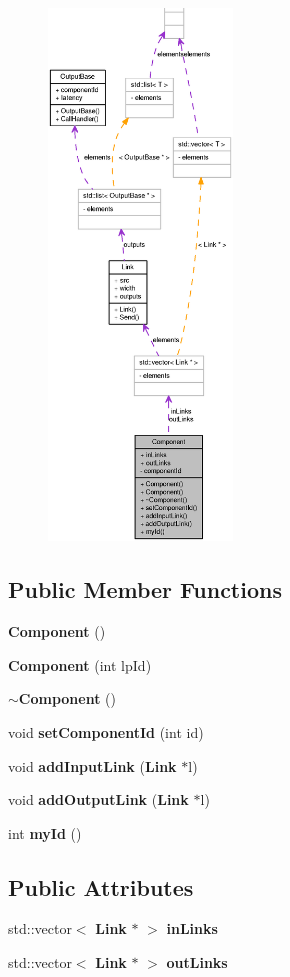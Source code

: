 \begin{figure}[H]
\begin{center}
\leavevmode
\includegraphics[height=400pt]{classComponent__coll__graph}
\end{center}
\end{figure}
\subsection*{Public Member Functions}
\begin{CompactItemize}
\item 
{\bf Component} ()
\item 
{\bf Component} (int lpId)
\item 
{\bf $\sim$Component} ()
\item 
void {\bf setComponentId} (int id)
\item 
void {\bf addInputLink} ({\bf Link} $\ast$l)
\item 
void {\bf addOutputLink} ({\bf Link} $\ast$l)
\item 
int {\bf myId} ()
\end{CompactItemize}
\subsection*{Public Attributes}
\begin{CompactItemize}
\item 
std::vector$<$ {\bf Link} $\ast$ $>$ {\bf inLinks}
\item 
std::vector$<$ {\bf Link} $\ast$ $>$ {\bf outLinks}
\end{CompactItemize}
